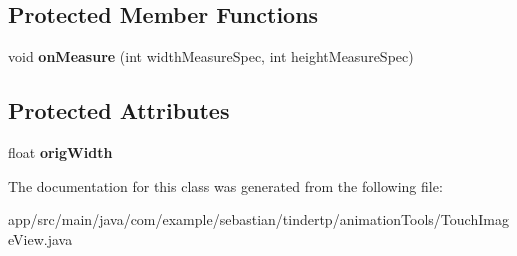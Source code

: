 \subsection*{Protected Member Functions}
\begin{DoxyCompactItemize}
\item 
void {\bfseries on\+Measure} (int width\+Measure\+Spec, int height\+Measure\+Spec)\hypertarget{classcom_1_1example_1_1sebastian_1_1tindertp_1_1animationTools_1_1TouchImageView_a8f4299045b983fb012a47f97998cd260}{}\label{classcom_1_1example_1_1sebastian_1_1tindertp_1_1animationTools_1_1TouchImageView_a8f4299045b983fb012a47f97998cd260}

\end{DoxyCompactItemize}
\subsection*{Protected Attributes}
\begin{DoxyCompactItemize}
\item 
float {\bfseries orig\+Width}\hypertarget{classcom_1_1example_1_1sebastian_1_1tindertp_1_1animationTools_1_1TouchImageView_a937d2ced1463ba624c1630e8ee08256f}{}\label{classcom_1_1example_1_1sebastian_1_1tindertp_1_1animationTools_1_1TouchImageView_a937d2ced1463ba624c1630e8ee08256f}

\end{DoxyCompactItemize}


The documentation for this class was generated from the following file\+:\begin{DoxyCompactItemize}
\item 
app/src/main/java/com/example/sebastian/tindertp/animation\+Tools/Touch\+Image\+View.\+java\end{DoxyCompactItemize}
